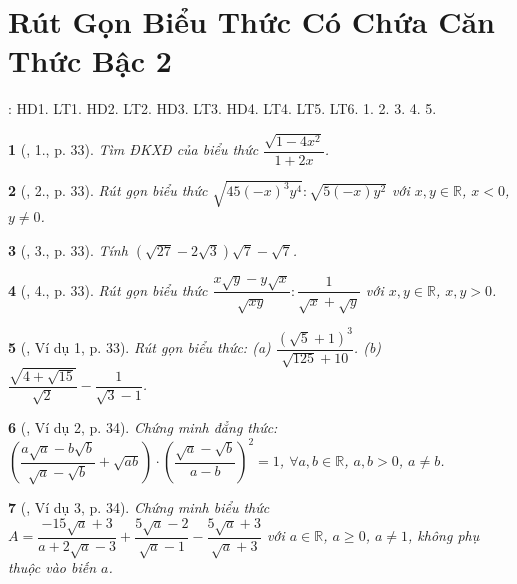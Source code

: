 \documentclass{article}
\newtheorem{baitoan}{}%
\begin{document}

\section{Rút Gọn Biểu Thức Có Chứa Căn Thức Bậc 2}
\cite[Chap. III, \S4, pp. 67--66]{SGK_Toan_9_Canh_Dieu_tap_1}: HD1. LT1. HD2. LT2. HD3. LT3. HD4. LT4. LT5. LT6. 1. 2. 3. 4. 5.

\begin{baitoan}[\cite{Binh_boi_duong_Toan_9_tap_1}, 1., p. 33]
	Tìm {\rm ĐKXĐ} của biểu thức $\dfrac{\sqrt{1 - 4x^2}}{1 + 2x}$.
\end{baitoan}

\begin{baitoan}[\cite{Binh_boi_duong_Toan_9_tap_1}, 2., p. 33]
	Rút gọn biểu thức $\sqrt{45(-x)^3y^4}:\sqrt{5(-x)y^2}$ với $x,y\in\mathbb{R}$, $x < 0$, $y\ne0$.
\end{baitoan}

\begin{baitoan}[\cite{Binh_boi_duong_Toan_9_tap_1}, 3., p. 33]
	Tính $(\sqrt{27} - 2\sqrt{3})\sqrt{7} - \sqrt{7}$.
\end{baitoan}

\begin{baitoan}[\cite{Binh_boi_duong_Toan_9_tap_1}, 4., p. 33]
	Rút gọn biểu thức $\dfrac{x\sqrt{y} - y\sqrt{x}}{\sqrt{xy}}:\dfrac{1}{\sqrt{x} + \sqrt{y}}$ với $x,y\in\mathbb{R}$, $x,y > 0$.
\end{baitoan}

\begin{baitoan}[\cite{Binh_boi_duong_Toan_9_tap_1}, Ví dụ 1, p. 33]
	Rút gọn biểu thức: (a) $\dfrac{(\sqrt{5} + 1)^3}{\sqrt{125} + 10}$. (b) $\dfrac{\sqrt{4 + \sqrt{15}}}{\sqrt{2}} - \dfrac{1}{\sqrt{3} - 1}$.
\end{baitoan}

\begin{baitoan}[\cite{Binh_boi_duong_Toan_9_tap_1}, Ví dụ 2, p. 34]
	Chứng minh đẳng thức: $\left(\dfrac{a\sqrt{a} - b\sqrt{b}}{\sqrt{a} - \sqrt{b}} + \sqrt{ab}\right)\cdot\left(\dfrac{\sqrt{a} - \sqrt{b}}{a - b}\right)^2 = 1$, $\forall a,b\in\mathbb{R}$, $a,b > 0$, $a\ne b$.
\end{baitoan}

\begin{baitoan}[\cite{Binh_boi_duong_Toan_9_tap_1}, Ví dụ 3, p. 34]
	Chứng minh biểu thức $A = \dfrac{-15\sqrt{a} + 3}{a + 2\sqrt{a} - 3} + \dfrac{5\sqrt{a} - 2}{\sqrt{a} - 1} - \dfrac{5\sqrt{a} + 3}{\sqrt{a} + 3}$ với $a\in\mathbb{R}$, $a\ge0$, $a\ne1$, không phụ thuộc vào biến $a$.
\end{baitoan}
\end{document}
